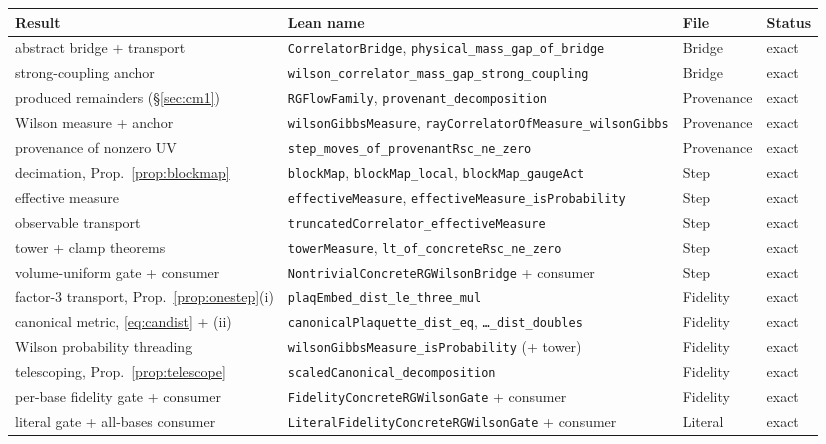 \documentclass[11pt]{article}
\theoremstyle{definition}
\newcommand{\lean}[1]{\texttt{#1}}
\begin{document}
\begin{center}
\scriptsize
\begin{tabular}{@{}llll@{}}
\toprule
Result & Lean name & File & Status \\
\midrule
abstract bridge + transport & \lean{CorrelatorBridge}, \lean{physical\_mass\_gap\_of\_bridge} & Bridge & exact \\
strong-coupling anchor & \lean{wilson\_correlator\_mass\_gap\_strong\_coupling} & Bridge & exact \\
produced remainders (\S\ref{sec:cm1}) & \lean{RGFlowFamily}, \lean{provenant\_decomposition} & Provenance & exact \\
Wilson measure + anchor & \lean{wilsonGibbsMeasure}, \lean{rayCorrelatorOfMeasure\_wilsonGibbs} & Provenance & exact \\
provenance of nonzero UV & \lean{step\_moves\_of\_provenantRsc\_ne\_zero} & Provenance & exact \\
decimation, Prop.~\ref{prop:blockmap} & \lean{blockMap}, \lean{blockMap\_local}, \lean{blockMap\_gaugeAct} & Step & exact \\
effective measure & \lean{effectiveMeasure}, \lean{effectiveMeasure\_isProbability} & Step & exact \\
observable transport & \lean{truncatedCorrelator\_effectiveMeasure} & Step & exact \\
tower + clamp theorems & \lean{towerMeasure}, \lean{lt\_of\_concreteRsc\_ne\_zero} & Step & exact \\
volume-uniform gate + consumer & \lean{NontrivialConcreteRGWilsonBridge} + consumer & Step & exact \\
factor-3 transport, Prop.~\ref{prop:onestep}(i) & \lean{plaqEmbed\_dist\_le\_three\_mul} & Fidelity & exact \\
canonical metric, \eqref{eq:candist} + (ii) & \lean{canonicalPlaquette\_dist\_eq}, \lean{\dots\_dist\_doubles} & Fidelity & exact \\
Wilson probability threading & \lean{wilsonGibbsMeasure\_isProbability} (+ tower) & Fidelity & exact \\
telescoping, Prop.~\ref{prop:telescope} & \lean{scaledCanonical\_decomposition} & Fidelity & exact \\
per-base fidelity gate + consumer & \lean{FidelityConcreteRGWilsonGate} + consumer & Fidelity & exact \\
literal gate + all-bases consumer & \lean{LiteralFidelityConcreteRGWilsonGate} + consumer & Literal & exact \\

\end{tabular}
\end{center}
\end{document}
